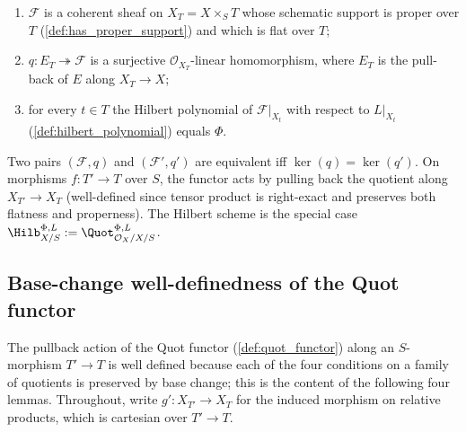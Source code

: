 \begin{definition}
  \begin{enumerate}
    \item \(\mathcal{F}\) is a coherent sheaf on \(X_T = X \times_S T\) whose
      schematic support is proper over \(T\) (\cref{def:has_proper_support}) and
      which is flat over \(T\);
    \item \(q : E_T \twoheadrightarrow \mathcal{F}\) is a surjective
      \(\mathcal{O}_{X_T}\)-linear homomorphism, where \(E_T\) is the pull-back
      of \(E\) along \(X_T \to X\);
    \item for every \(t \in T\) the Hilbert polynomial of \(\mathcal{F}|_{X_t}\)
      with respect to \(L|_{X_t}\) (\cref{def:hilbert_polynomial}) equals
      \(\Phi\).
  \end{enumerate}
  Two pairs \((\mathcal{F}, q)\) and \((\mathcal{F}', q')\) are equivalent iff
  \(\ker(q) = \ker(q')\). On morphisms \(f : T' \to T\) over \(S\), the functor
  acts by pulling back the quotient along \(X_{T'} \to X_T\) (well-defined
  since tensor product is right-exact and preserves both flatness and
  properness). The Hilbert scheme is the special case
  \(\Hilb^{\Phi,L}_{X/S} := \Quot^{\Phi,L}_{\mathcal{O}_X/X/S}\).
\end{definition}

\subsection{Base-change well-definedness of the Quot functor}
\label{sec:quot_base_change}

The pullback action of the Quot functor (\cref{def:quot_functor}) along an
\(S\)-morphism \(T' \to T\) is well defined because each of the four
conditions on a family of quotients is preserved by base change; this is the
content of the following four lemmas.  Throughout, write
\(g' : X_{T'} \to X_T\) for the induced morphism on relative products, which
is cartesian over \(T' \to T\).

